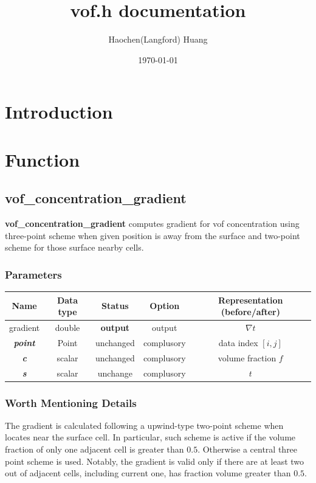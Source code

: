 \documentclass[a4paper]{article}
\title{vof.h documentation}
\author{Haochen(Langford) Huang}
\date{\today}
\newcommand{\func}[1]{\textbf{\textcolor{function}{#1}}}
\newcommand{\para}[1]{\textbf{\emph{\textcolor{para}{#1}}}}
\begin{document}
\maketitle
\section{Introduction}
\section{Function}
\subsection{\func{vof\_concentration\_gradient}}
\func{vof\_concentration\_gradient} computes gradient for vof concentration using three-point scheme when given position is away from the surface and two-point scheme for those surface nearby cells.
\subsubsection{Parameters}
\begin{table}[h]
  \centering
  \begin{tabular}{|c|c|c|c|c|}
    \hline
    Name & Data type & Status & Option & Representation (before/after)\\[0.5ex]
    \hline\hline
    \rowcolor{output} gradient & double & \textbf{output} & output & $\nabla t$\\
    \hline
    \para{point} & Point & unchanged & complusory & data index $[i,j]$\\
    \hline
    \para{c} & scalar & unchanged & complusory & volume fraction $f$\\
    \hline
    \para{s} & scalar & unchange & complusory & $t$\\
    \hline
  \end{tabular}
\end{table}
\subsubsection{Worth Mentioning Details}
The gradient is calculated following a upwind-type two-point scheme when locates near the surface cell. In particular, such scheme is active if the volume fraction of only one adjacent cell is greater than $0.5$. Otherwise a central three point scheme is used. Notably, the gradient is valid only if there are at least two out of adjacent cells, including current one, has fraction volume greater than $0.5$.
\end{document}
